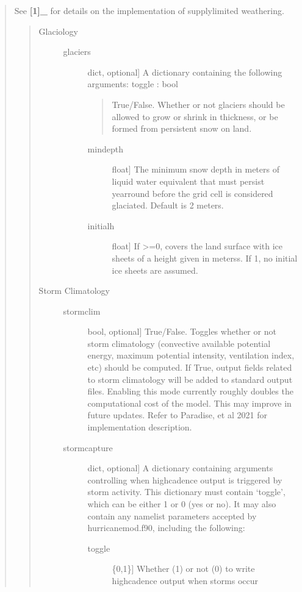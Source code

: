 \documentclass[letterpaper,10pt,english]{sphinxmanual}
\begin{document}
\begin{fulllineitems}
\begin{fulllineitems}
\begin{quote}
See {\color{red}\bfseries{}{[}1{]}\_} for details on the implementation of supply\sphinxhyphen{}limited weathering.
\begin{quote}
\begin{description}
\item[{Glaciology}] \leavevmode\begin{description}
\item[{glaciers}] \leavevmode{[}dict, optional{]}
A dictionary containing the following arguments:
toggle : bool
\begin{quote}

True/False. Whether or not glaciers should be allowed to grow or shrink in thickness, or be formed from persistent snow on land.
\end{quote}
\begin{description}
\item[{mindepth}] \leavevmode{[}float{]}
The minimum snow depth in meters of liquid water equivalent that must persist year\sphinxhyphen{}round before the grid cell is considered glaciated. Default is 2 meters.

\item[{initialh}] \leavevmode{[}float{]}
If \textgreater{}=0, covers the land surface with ice sheets of a height given in meterss. If \sphinxhyphen{}1, no initial ice sheets are assumed.

\end{description}

\end{description}

\item[{Storm Climatology}] \leavevmode\begin{description}
\item[{stormclim}] \leavevmode{[}bool, optional{]}
True/False. Toggles whether or not storm climatology (convective available
potential energy, maximum potential intensity, ventilation index, etc)
should be computed. If True, output fields related to storm climatology
will be added to standard output files. Enabling this mode currently roughly
doubles the computational cost of the model. This may improve in future
updates. Refer to Paradise, et al 2021 for implementation description.

\item[{stormcapture}] \leavevmode{[}dict, optional{]}
A dictionary containing arguments controlling when high\sphinxhyphen{}cadence output
is triggered by storm activity. This dictionary must contain ‘toggle’, which
can be either 1 or 0 (yes or no). It may also contain any namelist
parameters accepted by hurricanemod.f90, including the following:
\begin{description}
\item[{toggle}] \leavevmode{[}\{0,1\}{]}
Whether (1) or not (0) to write high\sphinxhyphen{}cadence output when storms occur


\end{description}
\end{description}
\end{description}
\end{quote}
\end{quote}
\end{fulllineitems}
\end{fulllineitems}
\end{document}

